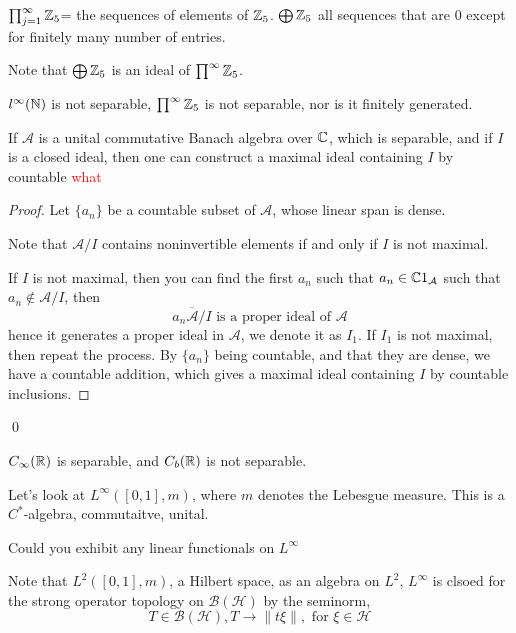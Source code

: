 \begin{definition}
    $\prod_{j=1}^\infty \mathbb{Z}_5$= the sequences of elements of $\mathbb{Z}_5$.
    $\bigoplus \mathbb{Z}_5$ all sequences that are 0 except for finitely many number of entries.
\end{definition}
Note that $\bigoplus\mathbb{Z}_5$ is an ideal of $\prod^\infty\mathbb{Z}_5$. 

\begin{proposition}
    $l^\infty(\mathbb{N})$ is not separable, $\prod^\infty \mathbb{Z}_5$ is not separable, nor is it finitely generated.
\end{proposition}

\begin{proposition}
    If $\mathcal{A}$ is a unital commutative Banach algebra over $\mathbb{C}$, which is separable, and if $I$ is a closed ideal, then one can construct a maximal ideal containing $I$ by countable \textcolor{red}{what}
\end{proposition}
\begin{proof}
    Let $\{a_n\}$ be a countable subset of $\mathcal{A}$, whose linear span is dense.  
    \begin{lemma}
        Note that $\mathcal{A}/I$ contains noninvertible elements if and only if $I$ is not maximal.
    \end{lemma}
    If $I$ is not maximal, then you can find the first $a_n$ such that $a_n\in\mathbb{C} 1_\mathcal{A}$ such that $a_n\not\in \mathcal{A}/I$, then 
    \begin{equation*}
        \overline{a_n\mathcal{A}/I} \text{ is a proper ideal of } \mathcal{A}
    \end{equation*}
    hence it generates a proper ideal in $\mathcal{A}$, we denote it as $I_1$. If $I_1$ is not maximal, then repeat the process. By $\{a_n\}$ being countable, and that they are dense, we have a countable addition, which gives a maximal ideal containing $I$ by countable inclusions.
\end{proof}
\qed

\begin{remark}
    $C_\infty(\mathbb{R})$ is separable, and $C_b(\mathbb{R})$ is not separable.
\end{remark}

Let's look at $L^\infty([0,1], m)$, where $m$ denotes the Lebesgue measure. This is a $C^*$-algebra, commutaitve, unital.

Could you exhibit any linear functionals on $L^\infty$

Note that $L^2([0,1],m)$, a Hilbert space, as an algebra on $L^2$, $L^\infty$ is clsoed for the strong operator topology on $\mathcal{B}(\mathcal{H})$ by the seminorm,
\begin{equation*}
    T\in\mathcal{B}(\mathcal{H}), T\to\|t\xi\|, \text{ for } \xi\in\mathcal{H}
\end{equation*}

